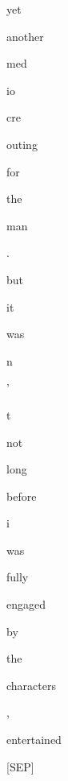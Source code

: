 \documentclass[varwidth=150mm]{standalone}
\begin{document}
\begin{CJK*}{UTF8}{gbsn}
{{{\colorbox{red!0.0}{\strut yet} \colorbox{red!1.1434526443481445}{\strut another} \colorbox{red!0.0}{\strut med}\colorbox{red!1.3837628364562988}{\strut io}\colorbox{red!1.299845576286316}{\strut cre} \colorbox{red!4.3831305503845215}{\strut outing} \colorbox{red!1.1603989601135254}{\strut for} \colorbox{red!0.0}{\strut the} \colorbox{red!1.3582960367202759}{\strut man} \colorbox{red!0.0}{\strut .} \colorbox{red!1.9464755058288574}{\strut but} \colorbox{red!1.8210124969482422}{\strut it} \colorbox{red!2.6985702514648438}{\strut was} \colorbox{red!38.26119613647461}{\strut n} \colorbox{red!0.0}{\strut '} \colorbox{red!1.2796924114227295}{\strut t} \colorbox{red!3.3003528118133545}{\strut not} \colorbox{red!0.0}{\strut long} \colorbox{red!0.0}{\strut before} \colorbox{red!7.060620307922363}{\strut i} \colorbox{red!4.3615312576293945}{\strut was} \colorbox{red!4.30408239364624}{\strut fully} \colorbox{red!2.4389355182647705}{\strut engaged} \colorbox{red!1.1101399660110474}{\strut by} \colorbox{red!1.9114563465118408}{\strut the} \colorbox{red!6.548654079437256}{\strut characters} \colorbox{red!8.693083763122559}{\strut ,} \colorbox{red!7.237091064453125}{\strut entertained} \colorbox{red!3.599479913711548}{\strut [SEP]}
}}}
\end{CJK*}
\end{document}
